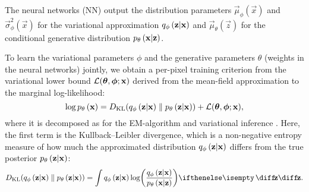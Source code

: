 The neural networks (NN) output the distribution parameters $\vec{\mu}_\phi(\vec{x})$ and $\vec{\sigma}^2_\phi(\vec{x})$ for the variational approximation $q_{\phi}\left(\bm{\mathrm{z}}|\bm{\mathrm{x}}\right)$ and $\vec{\mu}_\theta(\vec{z})$ for the conditional generative distribution $p_{\theta}\left(\bm{\mathrm{x}}|\bm{\mathrm{z}}\right)$.

To learn the variational parameters $\phi$ and the generative parameters $\theta$ (weights in the neural networks) jointly, we obtain a per-pixel training criterion from the variational lower bound $\mathcal{L}(\bm{\mathrm{\theta}},\bm{\mathrm{\phi}};\bm{\mathrm{x}})$ derived from the mean-field approximation to the marginal log-likelihood:
\begin{equation}
	\log p_{\theta}\left(\bm{\mathrm{x}}\right) = D_{\text{KL}}( q_{\phi}\left(\bm{\mathrm{z}}|\bm{\mathrm{x}}\right) \parallel p_{\theta}\left(\bm{\mathrm{z}}|\bm{\mathrm{x}}\right)) + \mathcal{L}(\bm{\mathrm{\theta}},\bm{\mathrm{\phi}};\bm{\mathrm{x}}) ,
\end{equation} 
where it is decomposed as for the EM-algorithm and variational inference \cite[\S10.2]{Bishop2006}. Here, the first term is the Kullback--Leibler divergence, which is a non-negative entropy measure of how much the approximated distribution $q_{\phi}\left(\bm{\mathrm{z}}|\bm{\mathrm{x}}\right)$ differs from the true posterior $p_{\theta}\left(\bm{\mathrm{z}}|\bm{\mathrm{x}}\right)$:
\begin{equation}
    D\idx{KL}\parens{ \enc{\vec{z}|\vec{x}} \parallel \dec{\vec{z}|\vec{x}}} = \int  \enc{\vec{z}|\vec{x}} \log \parens*{ \frac{\enc{\vec{z}|\vec{x}}}{\dec{\vec{x}|\vec{z}}} } \D{\vec{z}} .
\end{equation}

